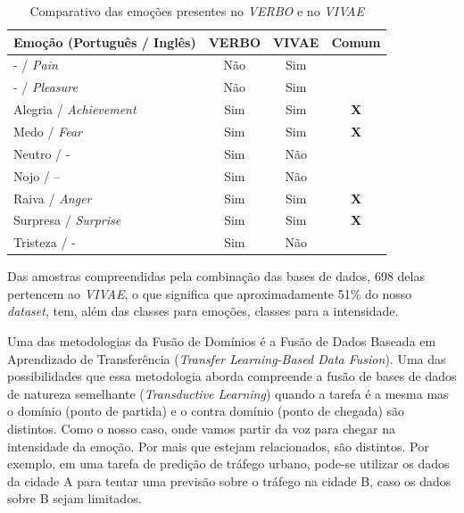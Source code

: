 \begin{table}[!ht]\label{table:verbovsvivae}
\centering
\caption{Comparativo das emoções presentes no \textit{VERBO} e no \textit{VIVAE}}
    \begin{tabular}{|l|c|c|c|}
    \hline
        Emoção (Português / Inglês) & VERBO & VIVAE & Comum  \\ \hline
        - / \textit{Pain} & Não & Sim &    \\ \hline
        - / \textit{Pleasure} & Não & Sim &    \\ \hline
        Alegria / \textit{Achievement} & Sim & Sim & \textbf{X}  \\ \hline
        Medo / \textit{Fear} & Sim & Sim & \textbf{X}  \\ \hline
        Neutro / - & Sim & Não &    \\ \hline
        Nojo / – & Sim & Não &    \\ \hline
        Raiva / \textit{Anger} & Sim & Sim & \textbf{X}  \\ \hline
        Surpresa / \textit{Surprise} & Sim & Sim & \textbf{X}  \\ \hline
        Tristeza / - & Sim & Não &    \\ \hline
    \end{tabular}
\end{table}

Das amostras compreendidas pela combinação das bases de dados, 698 delas pertencem ao \textit{VIVAE}, o que significa que aproximadamente 51\% do nosso \textit{dataset}, tem, além das classes para emoções, classes para a intensidade.

Uma das metodologias da Fusão de Domínios \cite{59} é a Fusão de Dados Baseada em Aprendizado de Transferência (\textit{Transfer Learning-Based Data Fusion}). Uma das possibilidades que essa metodologia aborda compreende a fusão de bases de dados de natureza semelhante (\textit{Transductive Learning}) quando a tarefa é a mesma mas o domínio (ponto de partida) e o contra domínio (ponto de chegada) são distintos. Como o nosso caso, onde vamos partir da voz para chegar na intensidade da emoção. Por mais que estejam relacionados, são distintos. Por exemplo, em uma tarefa de predição de tráfego urbano, pode-se utilizar os dados da cidade A para tentar uma previsão sobre o tráfego na cidade B, caso os dados sobre B sejam limitados. 

